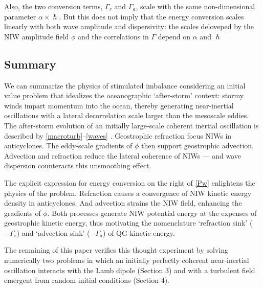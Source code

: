 \documentclass{jfm}
\begin{document}
Also, the two conversion terms, $\Gamma_r$ and $\Gamma_a$,
scale with the same non-dimensional parameter $\alpha\times \hslash$. But this
does not imply that the energy conversion scales linearly with both wave amplitude
and dispersivity: the scales deloveped by the NIW amplitude field $\phi$ and the
 correlations in $\Gamma$ depend on $\alpha$ and $\hslash$


\subsection{Summary}
We can summarize the physics of stimulated imbalance considering an initial value
problem that idealizes the oceanographic `after-storm' context: stormy winds impart momentum
into the ocean, thereby generating near-inertial oscillations with a lateral
decorrelation scale larger than the mesoscale eddies. The after-storm evolution
of an initially large-scale coherent inertial oscillation is described by
\eqref{macroturb}--\eqref{waves} \citep{xie_vanneste2015}. Geostrophic refraction
focus NIWs in anticyclones. The eddy-scale gradients of $\phi$ then support
geostrophic advection. Advection and refraction reduce the lateral coherence
of NIWs --- and wave dispersion counteracts this unsmoothing effect.

The explicit expression for energy
conversion on the right of \eqref{Pw} enlightens the physics of  the problem.
Refraction causes a convergence of NIW kinetic energy density in anticyclones.
And advection strains the NIW field, enhancing the gradients of $\phi$. Both
processes generate NIW potential energy at the expenses of geostrophic kinetic
energy, thus motivating the nomenclature `refraction sink' ($-\Gamma_r$) and
`advection sink' ($-\Gamma_a$)  of QG kinetic energy.

The remaining of this paper verifies this thought experiment by solving
numerically two problems in which an initially perfectly coherent near-inertial
oscillation interacts with the Lamb dipole (Section 3) and with a turbulent
field emergent from random initial conditions (Section 4).
\end{document}
